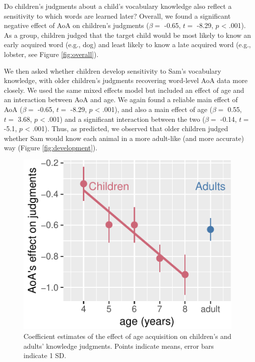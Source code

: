 \documentclass[10pt, letterpaper]{article}
\newenvironment{CodeChunk}{}{}
\begin{document}
Do children's judgments about a child's vocabulary knowledge also
reflect a sensitivity to which words are learned later? Overall, we
found a significant negative effect of AoA on children's judgments
(\(\beta =\) -0.65, \(t =\) -8.29, \(p\) \textless{} .001). As a group,
children judged that the target child would be most likely to know an
early acquired word (e.g., dog) and least likely to know a late acquired
word (e.g., lobster, see Figure \ref{fig:overall}).

We then asked whether children develop sensitivity to Sam's vocabulary
knowledge, with older children's judgments recovering word-level AoA
data more closely. We used the same mixed effects model but included an
effect of age and an interaction between AoA and age. We again found a
reliable main effect of AoA (\(\beta =\) -0.65, \(t =\) -8.29, \(p\)
\textless{} .001), and also a main effect of age (\(\beta =\) 0.55,
\(t =\) 3.68, \(p\) \textless{} .001) and a significant interaction
between the two (\(\beta =\) -0.14, \(t =\) -5.1, \(p\) \textless{}
.001). Thus, as predicted, we observed that older children judged
whether Sam would know each animal in a more adult-like (and more
accurate) way (Figure \ref{fig:development}).

\begin{CodeChunk}
\begin{figure}[tb]
\includegraphics{figs/unnamed-chunk-8-1} \caption[Coefficient estimates of the effect of age acquisition on children's and adults' knowledge judgments]{Coefficient estimates of the effect of age acquisition on children's and adults' knowledge judgments. Points indicate means, error bars indicate 1 SD.}\label{fig:unnamed-chunk-8}
\end{figure}
\end{CodeChunk}
\end{document}
